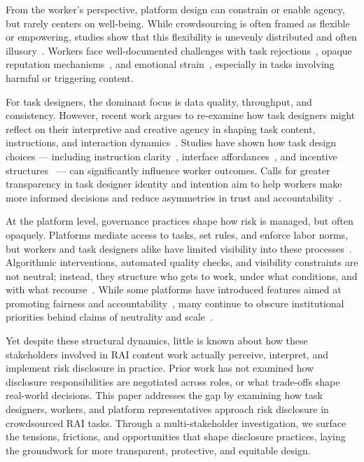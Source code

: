 From the worker's perspective, platform design can constrain or enable agency, but rarely centers on well-being. While crowdsourcing is often framed as flexible or empowering, studies show that this flexibility is unevenly distributed and often illusory~\cite{rechkemmer2022understanding, varanasi2022feeling, liang2021embracing}. Workers face well-documented challenges with task rejections~\cite{mcinnis2016taking}, opaque reputation mechanisms~\cite{saito2019turkscanner}, and emotional strain~\cite{flores2020challenges, martin2014being}, especially in tasks involving harmful or triggering content.

For task designers, the dominant focus is data quality, throughput, and consistency. However, recent work argues to re-examine how task designers might reflect on their interpretive and creative agency in shaping task content, instructions, and interaction dynamics~\cite{zheng2011task, bragg2018sprout, qian2025locating}. Studies have shown how task design choices --- including instruction clarity~\cite{wu2017confusing}, interface affordances~\cite{han2020crowd}, and incentive structures~\cite{ho2015incentivizing} --- can significantly influence worker outcomes. Calls for greater transparency in task designer identity and intention aim to help workers make more informed decisions and reduce asymmetries in trust and accountability~\cite{sutherland2018sharing, whiting2019fair, qian2025locating}.

At the platform level, governance practices shape how risk is managed, but often opaquely. Platforms mediate access to tasks, set rules, and enforce labor norms, but workers and task designers alike have limited visibility into these processes~\cite{toxtli2021quantifying, whiting2019fair, fieseler_unfairness_2019}. Algorithmic interventions, automated quality checks, and visibility constraints are not neutral; instead, they structure who gets to work, under what conditions, and with what recourse~\cite{gadiraju2017modus, rzeszotarski2012crowdscape}. While some platforms have introduced features aimed at promoting fairness and accountability~\cite{silberman2018responsible, whiting2019fair}, many continue to obscure institutional priorities behind claims of neutrality and scale~\cite{gray2016crowd, kingsley2015accounting}.

Yet despite these structural dynamics, little is known about how these stakeholders involved in RAI content work actually perceive, interpret, and implement risk disclosure in practice. Prior work has not examined how disclosure responsibilities are negotiated across roles, or what trade-offs shape real-world decisions. This paper addresses the gap by examining how task designers, workers, and platform representatives approach risk disclosure in crowdsourced RAI tasks. Through a multi-stakeholder investigation, we surface the tensions, frictions, and opportunities that shape disclosure practices, laying the groundwork for more transparent, protective, and equitable design.

